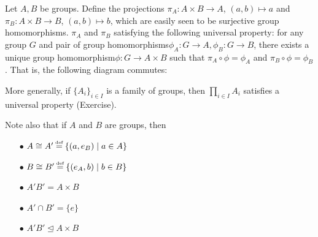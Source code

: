 \documentclass[11pt]{book}
\theoremstyle{definition}   \newtheorem{defn}[counter]{Definition} %
\newcommand{\blt}{$\bullet$}   \newcommand{\tn}{\textnormal}   \newcommand{\tb}{\textbf}   \newcommand{\mbb}{\mathbb}
\newcommand{\nsg}{\mathrel{\unlhd}}   \newcommand{\ind}{\parindent24pt}   \newcommand{\vn}{\varnothing}
\newcommand\myeq{\mathrel{\overset{\makebox[0pt]{\mbox{\normalfont\tiny\sffamily \textrm{def}}}}{=}}}
\newcommand{\hm}{homomorphism}   \newcommand{\hms}{homomorphisms}   \newcommand{\iso}{isomorphism}
\DeclareMathOperator{\ra}{\rightarrow}   \DeclareMathOperator{\Poly}{\mathbf{P}}   \DeclareMathOperator{\spn}{\textnormal{span}}   \DeclareMathOperator{\aut}{\textnormal{Aut}}
\numberwithin{counter}{chapter}
\begin{document}
\begin{remark}
Let $A,B$ be groups. Define the projections $\pi_A : A \times B \ra A$, $(a,b) \mapsto a$ and $\pi_B : A \times B \ra B$, $(a,b) \mapsto b$, which are easily seen to be surjective group \hms. $\pi_A$ and $\pi_B$ satisfying the following universal property: for any group $G$ and pair of group \hms $\phi_A : G \ra A, \phi_B : G \ra B$, there exists a unique group \hm $\phi : G \ra A \times B$ such that $\pi_A\circ \phi = \phi_A$ and $\pi_B \circ \phi = \phi_B$. That is, the following diagram commutes: \\

	\begin{center}
	\end{center}
More generally, if $\{A_i\}_{i\in I}$ is a family of groups, then $\prod_{i\in I} A_i$ satisfies a universal property (Exercise).
\newpage
\end{remark}

Note also that if $A$ and $B$ are groups, then
	\begin{enumerate}
	\item[\blt] $A \cong A' \myeq \{(a,e_B) \mid a \in A\}$
	\item[\blt] $B \cong B' \myeq \{(e_A,b) \mid b \in B\}$
	\item[\blt] $A'B' = A\times B$
	\item[\blt] $A'\cap B' = \{e\}$
	\item[\blt] $A'B' \nsg A \times B$
	\end{enumerate}
\ \\
\end{document}
